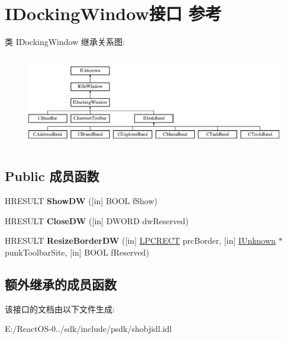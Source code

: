 \hypertarget{interface_i_docking_window}{}\section{I\+Docking\+Window接口 参考}
\label{interface_i_docking_window}
类 I\+Docking\+Window 继承关系图\+:\begin{figure}[H]
\begin{center}
\leavevmode
\includegraphics[height=4.093567cm]{interface_i_docking_window}
\end{center}
\end{figure}
\subsection*{Public 成员函数}
\begin{DoxyCompactItemize}
\item 
\mbox{\label{interface_i_docking_window_a9d4fd8cf1e8d5ee7a1bd72b331886d0b}} 
H\+R\+E\+S\+U\+LT {\bfseries Show\+DW} (\mbox{[}in\mbox{]} B\+O\+OL f\+Show)
\item 
\mbox{\label{interface_i_docking_window_a6547aa1eae5adc4c099a72d852f3c22e}} 
H\+R\+E\+S\+U\+LT {\bfseries Close\+DW} (\mbox{[}in\mbox{]} D\+W\+O\+RD dw\+Reserved)
\item 
\mbox{\label{interface_i_docking_window_a003d1b67b655b2b670ac08a812cf2c6f}} 
H\+R\+E\+S\+U\+LT {\bfseries Resize\+Border\+DW} (\mbox{[}in\mbox{]} \hyperlink{structtag_r_e_c_t}{L\+P\+C\+R\+E\+CT} prc\+Border, \mbox{[}in\mbox{]} \hyperlink{interface_i_unknown}{I\+Unknown} $\ast$punk\+Toolbar\+Site, \mbox{[}in\mbox{]} B\+O\+OL f\+Reserved)
\end{DoxyCompactItemize}
\subsection*{额外继承的成员函数}


该接口的文档由以下文件生成\+:\begin{DoxyCompactItemize}
\item 
E\+:/\+React\+O\+S-\/0../sdk/include/psdk/shobjidl.\+idl\end{DoxyCompactItemize}
